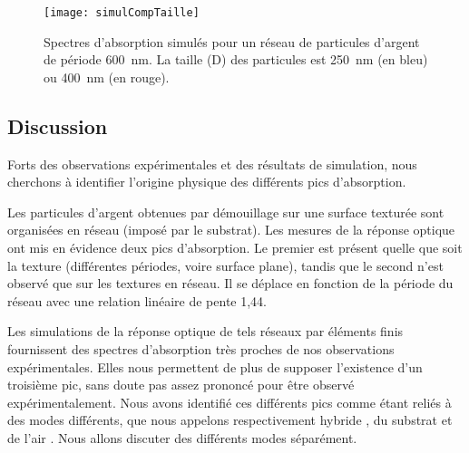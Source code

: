 \begin{figure}[!htb]
\centering
\texttt{[image: simulCompTaille]}
\caption{Spectres d'absorption simulés pour un réseau de particules d'argent de période 600~nm. La taille (D) des particules est 250~nm (en bleu) ou 400~nm (en rouge).}
\label{simulCompTaille}
\end{figure}

\subsection{Discussion}
Forts des observations expérimentales et des résultats de simulation, nous cherchons à identifier l'origine physique des différents pics d'absorption.\par 
Les particules d'argent obtenues par démouillage sur une surface texturée sont organisées en réseau (imposé par le substrat). Les mesures de la réponse optique ont mis en évidence deux pics d'absorption. Le premier est présent quelle que soit la texture (différentes périodes, voire surface plane), tandis que le second n'est observé que sur les textures en réseau. Il se déplace en fonction de la période du réseau avec une relation linéaire de pente 1,44.\par 
Les simulations de la réponse optique de tels réseaux par éléments finis fournissent des spectres d'absorption très proches de nos observations expérimentales. Elles nous permettent de plus de supposer l'existence d'un troisième pic, sans doute pas assez prononcé pour être observé expérimentalement. Nous avons identifié ces différents pics comme étant reliés à des modes différents, que nous appelons respectivement \og hybride \fg, \og du substrat \fg{} et \og de l'air \fg. Nous allons discuter des différents modes séparément.\par 
